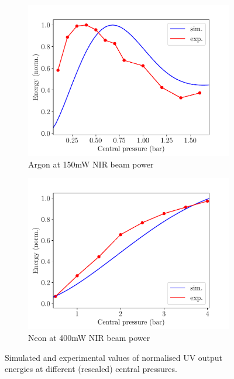 \documentclass[a4paper]{jpconf}
\begin{document}
\begin{figure}[h]
\centering
 \begin{subfigure}{0.5\textwidth}
\includegraphics[width=\textwidth]{im/energies_Ar}
\caption{Argon at 150mW NIR beam power}\label{im:sim_v_measured_Ar}
\end{subfigure}
 \begin{subfigure}{0.5\textwidth}
\includegraphics[width=\textwidth]{im/energies_Ne}
\caption{Neon at 400mW NIR beam power}\label{im:sim_v_measured_Ne}
\end{subfigure}
\caption{Simulated and experimental values of normalised UV output energies at different (rescaled) central pressures.}\label{im:sim_v_measured}
\end{figure}
\end{document}

